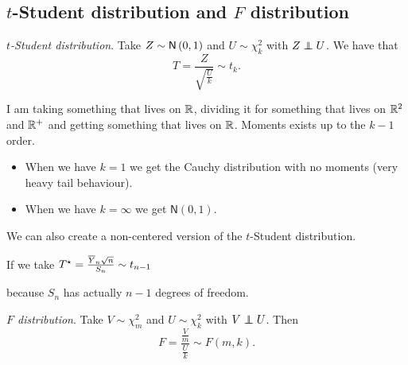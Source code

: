 \documentclass[12pt]{report}
\begin{document}
\subsection{$t$-Student distribution and $F$ distribution}
\begin{definition}
	\emph{$t$-Student distribution}. Take $Z\sim\mathsf{N}\left(0,1\right)$ and $U\sim\chi^{2}_{k}$ with $Z\indep U$. We have that
	\begin{equation*}
		T=\frac{Z}{\sqrt{\frac{U}{k}}}\sim t_{k}.
	\end{equation*}
\end{definition}
I am taking something that lives on $\mathbb{R}$, dividing it for something that lives on $\mathbb{R}^{2}$ and $\mathbb{R}^{+}$ and getting something that lives on $\mathbb{R}$. Moments exists up to the $k-1$ order.\begin{itemize}
	\item  When we have $k=1$ we get the Cauchy distribution with no moments (very heavy tail behaviour).
	\item When we have $k=\infty$ we get $\mathsf{N}(0,1)$.
\end{itemize}
We can also create a non-centered version of the $t$-Student distribution. 
\begin{remark}
	If we take $T^{\star}=\frac{\overline{Y}_{n}\sqrt{n}}{S_{n}}\sim t_{n-1}$
\end{remark}
because $S_{n}$ has actually $n-1$ degrees of freedom.
\begin{definition}
	\emph{$F$ distribution}. Take $V\sim\chi^{2}_{m}$ and $U\sim\chi^{2}_{k}$ with $V\indep U$. Then
	\begin{equation*}
		F=\frac{\frac{V}{m}}{\frac{U}{k}}\sim F(m,k).
	\end{equation*}
\end{definition}
\end{document}
